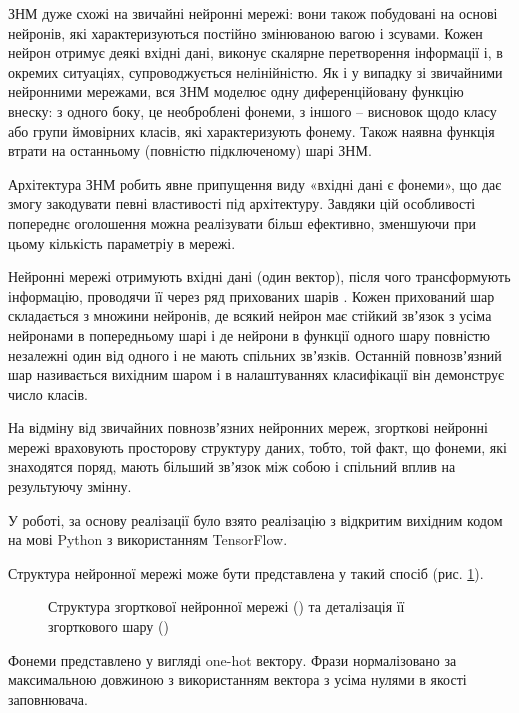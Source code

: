 ЗНМ дуже схожі на звичайні нейронні мережі: вони також побудовані на основі нейронів, які характеризуються постійно змінюваною вагою і зсувами. Кожен нейрон отримує деякі вхідні дані, виконує скалярне перетворення інформації і, в окремих ситуаціях, супроводжується нелінійністю. Як і у випадку зі звичайними нейронними мережами, вся ЗНМ моделює одну диференційовану функцію внеску: з одного боку, це необроблені фонеми, з іншого – висновок щодо класу або групи ймовірних класів, які характеризують фонему. Також наявна функція втрати на останньому (повністю підключеному) шарі ЗНМ.

Архітектура ЗНМ робить явне припущення виду «вхідні дані є фонеми», що дає змогу закодувати певні властивості під архітектуру. Завдяки цій особливості попереднє оголошення можна реалізувати більш ефективно, зменшуючи при цьому кількість параметріу в мережі.

Нейронні мережі отримують вхідні дані (один вектор), після чого трансформують інформацію, проводячи її через ряд прихованих шарів \cite{Kim_2014, Zhang_2015}. Кожен прихований шар складається з множини нейронів, де всякий нейрон має стійкий звʼязок з усіма нейронами в попередньому шарі і де нейрони в функції одного шару повністю незалежні один від одного і не мають спільних звʼязків. Останній повнозвʼязний шар називається вихідним шаром і в налаштуваннях класифікації він демонструє число класів.

На відміну від звичайних повнозвʼязних нейронних мереж, згорткові нейронні мережі враховують просторову структуру даних, тобто, той факт, що фонеми, які знаходятся поряд, мають більший звʼязок між собою і спільний вплив на результуючу змінну.

У роботі, за основу реалізації було взято реалізацію з відкритим вихідним кодом \cite{Britz_2015} на мові Python з використанням TensorFlow.

Структура нейронної мережі може бути представлена у такий спосіб (рис. \ref{img:cnn-struct}).

\begin{figure}
	\centering
	\hfill
	\caption{Структура згорткової нейронної мережі () та деталізація її згорткового шару ()}
	\label{img:cnn-struct}
\end{figure}

Фонеми представлено у вигляді one-hot вектору. Фрази нормалізовано за максимальною довжиною з використанням вектора з усіма нулями в якості заповнювача.

